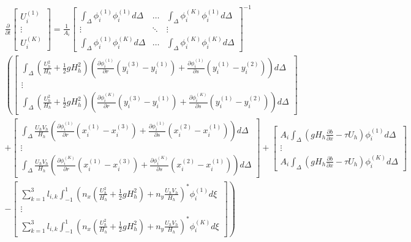\documentclass[11pt]{article}
\begin{document}
{\tiny
\begin{multline}
\frac{\partial}{\partial t} \begin{bmatrix} U_i^{(1)} \\[5pt] \vdots \\[5pt] U_i^{(K)}  \end{bmatrix} =\frac{1}{A_i}\begin{bmatrix}\displaystyle\int_{\Delta}\phi_i^{(1)}\phi_i^{(1)}d\Delta & \hdots & \displaystyle\int_{\Delta}\phi_i^{(K)}\phi_i^{(1)}d\Delta \\[5pt] \vdots & \ddots & \vdots \\[5pt]  \displaystyle\int_{\Delta}\phi_i^{(1)}\phi_i^{(K)}d\Delta & \hdots & \displaystyle\int_{\Delta}\phi_i^{(K)}\phi_i^{(K)}d\Delta\end{bmatrix}^{-1}  \\ \left( \begin{bmatrix}\displaystyle\int_{\Delta}\left(\frac{U_h^2}{H_h} + \frac{1}{2}gH_h^2\right)\left(\frac{\partial \phi_i^{(1)}}{\partial r}\left(y_i^{(3)}-y_i^{(1)}\right) + \frac{\partial \phi_i^{(1)}}{\partial s}\left(y_i^{(1)}-y_i^{(2)}\right) \right)d\Delta     \\ \vdots \\ \displaystyle\int_{\Delta}\left(\frac{U_h^2}{H_h} + \frac{1}{2}gH_h^2\right)\left(\frac{\partial \phi_i^{(K)}}{\partial r}\left(y_i^{(3)}-y_i^{(1)}\right) + \frac{\partial \phi_i^{(K)}}{\partial s}\left(y_i^{(1)}-y_i^{(2)}\right) \right) d\Delta \end{bmatrix} \right.\\ + \left. \begin{bmatrix}  \displaystyle\int_{\Delta}\frac{U_hV_h}{H_h}\left(\frac{\partial \phi_i^{(1)}}{\partial r}\left(x_i^{(1)}-x_i^{(3)}\right) + \frac{\partial \phi_i^{(1)}}{\partial s}\left(x_i^{(2)}-x_i^{(1)}\right) \right)d\Delta \\ \vdots \\ \displaystyle\int_{\Delta}\frac{U_hV_h}{H_h}\left(\frac{\partial \phi_i^{(K)}}{\partial r}\left(x_i^{(1)}-x_i^{(3)}\right) + \frac{\partial \phi_i^{(K)}}{\partial s}\left(x_i^{(2)}-x_i^{(1)}\right) \right) d\Delta \end{bmatrix} + \begin{bmatrix}A_i \displaystyle\int_{\Delta}\left( gH_h\frac{\partial b}{\partial x} - \tau U_h \right)\phi_i^{(1)} d\Delta  \\ \vdots \\  A_i\displaystyle\int_{\Delta}\left( gH_h\frac{\partial b}{\partial x} - \tau U_h \right)\phi_i^{(K)} d\Delta  \end{bmatrix} \right. \\ \left. -\begin{bmatrix}\displaystyle\sum_{k=1}^3 l_{i,k}\int_{-1}^1 \left(n_x\left(\frac{U_h^2}{H_h} + \frac{1}{2}gH_h^2\right) + n_y\frac{U_hV_h}{H_h}\right)^*\phi_i^{(1)} d\xi \\ \vdots \\ \displaystyle\sum_{k=1}^3 l_{i,k}\int_{-1}^1 \left(n_x\left(\frac{U_h^2}{H_h} + \frac{1}{2}gH_h^2\right) + n_y\frac{U_hV_h}{H_h}\right)^*\phi_i^{(K)} d\xi \end{bmatrix} \right) 
\end{multline}}
\end{document}
